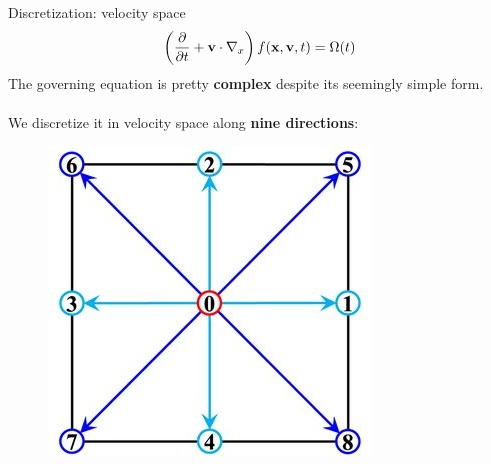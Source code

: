 \documentclass[9pt]{beamer}
\begin{document}
\begin{frame}[t]{Discretization: velocity space}
\begin{equation*}
\left( \frac{\partial}{\partial t}
      + {\bf v}\cdot\nabla_x\right)f({\bf x}, {\bf v}, t) = \Omega(t)
\end{equation*}
The governing equation is pretty \textbf{complex} despite its seemingly simple form. \\~\\

We discretize it in velocity space along \textbf{nine directions}:
\begin{figure}
\includegraphics[scale=0.25]{images/d2q9}
\centering
\end{figure}
\end{frame}
\end{document}
